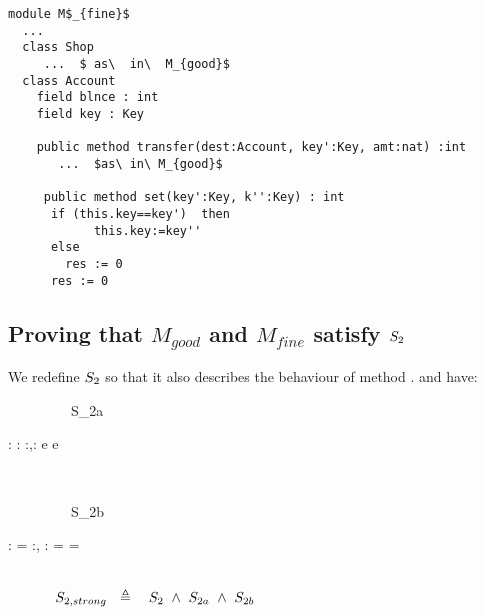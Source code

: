 \begin{lstlisting}[mathescape=true, language=Chainmail, frame=lines]
module M$_{fine}$
  ...   
  class Shop
     ...  $ as\  in\  M_{good}$
  class Account
    field blnce : int 
    field key : Key
    
    public method transfer(dest:Account, key':Key, amt:nat) :int
       ...  $as\ in\ M_{good}$
	  
     public method set(key':Key, k'':Key) : int
      if (this.key==key')  then
      		this.key:=key''
      else 
        res := 0
      res := 0
\end{lstlisting}

\subsection{Proving that $M_{good}$ and $M_{fine}$ satisfy  $S_2$}
\label{s:extend:spec}

We redefine $S_2$ so that it also describes the behaviour of method . and have:
\\
{\sprepost
		{\strut \ \ \ \ \ \ \ \ \ S_{2a}} 
		{ : \wedge  {}:  \wedge {} { } } %
		 {}
		 {}
		 {:,: }
		 {  {e} }
		 {  {e} }
}
\\
{\sprepost
		{\strut \ \ \ \ \ \ \ \ \ S_{2b}} 
		{ : \wedge {} = }
		 {}
		 {}
		 {:, : }
		 {  = }
		{    = }
}
\\
$\strut  \SPSP  \STwoStrong \ \  \triangleq \ \ \ \STwo \ \wedge \ S_{2a} \ \wedge \ S_{2b} $




 \label{s:app:example:proofs}
 

